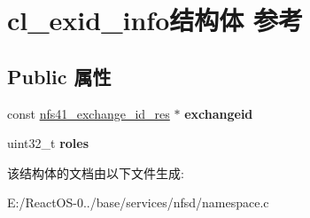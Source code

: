 \hypertarget{structcl__exid__info}{}\section{cl\+\_\+exid\+\_\+info结构体 参考}
\label{structcl__exid__info}
\subsection*{Public 属性}
\begin{DoxyCompactItemize}
\item 
\mbox{\label{structcl__exid__info_a3d7d8fbde57c5a0c76757292af775b9c}} 
const \hyperlink{struct____nfs41__exchange__id__res}{nfs41\+\_\+exchange\+\_\+id\+\_\+res} $\ast$ {\bfseries exchangeid}
\item 
\mbox{\label{structcl__exid__info_abef28cc19a7167389de2aa9e00be5847}} 
uint32\+\_\+t {\bfseries roles}
\end{DoxyCompactItemize}


该结构体的文档由以下文件生成\+:\begin{DoxyCompactItemize}
\item 
E\+:/\+React\+O\+S-\/0../base/services/nfsd/namespace.\+c\end{DoxyCompactItemize}
